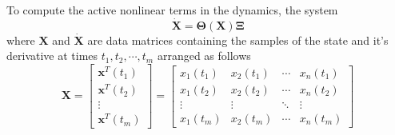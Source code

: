 \documentclass[12pt,preprintnumbers,amsmath,amssymb,titlepage]{report}
\begin{document}
To compute the active nonlinear terms in the dynamics, the system 
\begin{equation} \label{eqn:main}
	\bm{\dot{X}} = \bm{\Theta}(\bm{X})\bm{\Xi}
\end{equation}
where $\bm{X}$ and $\bm{\dot{X}}$ are data matrices containing the samples of the state and it's derivative at times $t_1, t_2, \cdots, t_m$ arranged as follows
\begin{equation*}
	\bm{X} = \begin{bmatrix} 
				\bm{x}^T(t_1) \\ \bm{x}^T(t_2) \\ \vdots \\ \bm{x}^T(t_m)
			\end{bmatrix}
		   = \begin{bmatrix}
		   		x_1(t_1) & x_2(t_1) & \cdots & x_n(t_1) \\
		   		x_1(t_2) & x_2(t_2) & \cdots & x_n(t_2) \\
		   		\vdots   & \vdots   & \ddots & \vdots  \\
		   		x_1(t_m) & x_2(t_m) & \cdots & x_n(t_m)
	   		\end{bmatrix}
\end{equation*}
\end{document}
